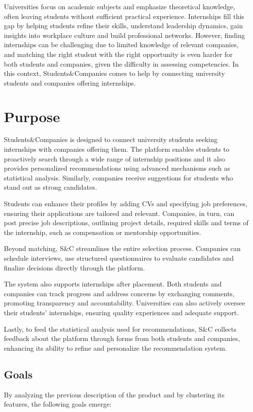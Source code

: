 Universities focus on academic subjects and emphasize theoretical knowledge, often leaving students without sufficient practical experience.
Internships fill this gap by helping students refine their skills, understand leadership dynamics, gain insights into workplace culture and build professional networks.
However, finding internships can be challenging due to limited knowledge of relevant companies, and matching the right student with the right opportunity is even harder for both students and companies, given the difficulty in assessing competencies.
In this context, Students\&Companies comes to help by connecting university students and companies offering internships.

\section{Purpose}
Students\&Companies is designed to connect university students seeking internships with companies offering them.
The platform enables students to proactively search through a wide range of internship positions and it also provides personalized recommendations using advanced mechanisms such as statistical analysis.
Similarly, companies receive suggestions for students who stand out as strong candidates.

Students can enhance their profiles by adding CVs and specifying job preferences, ensuring their applications are tailored and relevant.
Companies, in turn, can post precise job descriptions, outlining project details, required skills and terms of the internship, such as compensation or mentorship opportunities.

Beyond matching, S\&C streamlines the entire selection process.
Companies can schedule interviews, use structured questionnaires to evaluate candidates and finalize decisions directly through the platform. 

The system also supports internships after placement.
Both students and companies can track progress and address concerns by exchanging comments, promoting transparency and accountability.
Universities can also actively oversee their students' internships, ensuring quality experiences and adequate support.

Lastly, to feed the statistical analysis used for recommendations, S\&C collects feedback about the platform through forms from both students and companies, enhancing its ability to refine and personalize the recommendation system.

\subsection{Goals}
By analyzing the previous description of the product and by clustering its features, the following goals emerge:

